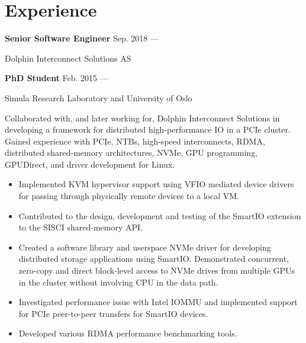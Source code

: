 \section{Experience}
\parbox[t][][t]{\linewidth}{
	\parbox{\linewidth}{\textbf{Senior Software Engineer}
		\hfill {{Sep. 2018 --- \phantom{Jun. 2019}}}}
		\smallbreak
	\parbox{\linewidth}{Dolphin Interconnect Solutions AS}
	\smallbreak
	\parbox{\linewidth}{\textbf{PhD Student}
		\hfill {{Feb. 2015 --- \phantom{Jun. 2019}}}}
		\smallbreak
	\parbox{\linewidth}{Simula Research Laboratory and University of Oslo}
	
	\bigskip
	Collaborated with, and later working for, Dolphin Interconnect Solutions in developing a framework for distributed
	high-performance IO in a PCIe cluster.
	Gained experience with PCIe, NTBs, high-speed interconnects, RDMA, distributed shared-memory
	architectures, NVMe, GPU programming, GPUDirect, and driver development for Linux.

	\bigskip
	\begin{itemize}
		\item{Implemented KVM hypervisor support using VFIO mediated device drivers
			for passing through physically remote devices to a local VM.}\\[-.6em]
		\item{Contributed to the design, development and testing of the SmartIO
			extension to the SISCI shared-memory API.}\\[-.6em]
		\item{Created a software library and userspace NVMe driver 
			for developing distributed storage applications using SmartIO.
			Demonstrated concurrent, zero-copy and direct block-level access to NVMe drives from
			multiple GPUs in the cluster without involving CPU in the data path.}\\[-.6em]
		\item{Investigated performance issue with Intel IOMMU and
			implemented support for PCIe peer-to-peer transfers for SmartIO devices.}\\[-.6em]
		\item{Developed various RDMA performance benchmarking tools.}
	\end{itemize}
	\bigskip
	\bigskip
}

